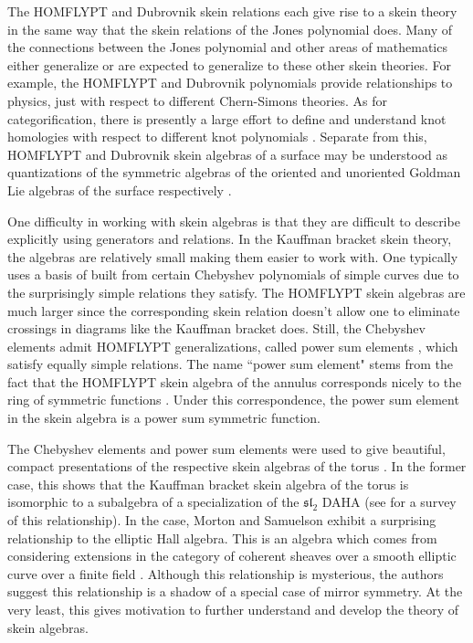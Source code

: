 The HOMFLYPT and Dubrovnik skein relations each give rise to a skein theory in the same way that the skein relations of the Jones polynomial does. Many of the connections between the Jones polynomial and other areas of mathematics either generalize or are expected to generalize to these other skein theories. For example, the HOMFLYPT and Dubrovnik polynomials provide relationships to physics, just with respect to different Chern-Simons theories. As for categorification, there is presently a large effort to define and understand knot homologies with respect to different knot polynomials \cite{KR08, Web17}. Separate from this, HOMFLYPT and Dubrovnik skein algebras of a surface may be understood as quantizations of the symmetric algebras of the oriented and unoriented Goldman Lie algebras of the surface respectively \cite{Tur91}. 

One difficulty in working with skein algebras is that they are difficult to describe explicitly using generators and relations. In the Kauffman bracket skein theory, the algebras are relatively small making them easier to work with. One typically uses a basis of built from certain Chebyshev polynomials of simple curves due to the surprisingly simple relations they satisfy. The HOMFLYPT skein algebras are much larger since the corresponding skein relation doesn't allow one to eliminate crossings in diagrams like the Kauffman bracket does. Still, the Chebyshev elements admit HOMFLYPT generalizations, called power sum elements \cite{Mor02b}, which satisfy equally simple relations. The name ``power sum element" stems from the fact that the HOMFLYPT skein algebra of the annulus corresponds nicely to the ring of symmetric functions \cite{Luk05}. Under this correspondence, the power sum element in the skein algebra is a power sum symmetric function. 

The Chebyshev elements and power sum elements were used to give beautiful, compact presentations of the respective skein algebras of the torus \cite{FG00, MS17}. In the former case, this shows that the Kauffman bracket skein algebra of the torus is isomorphic to a subalgebra of a specialization of the $\mathfrak{sl}_2$ DAHA (see \cite{MS19} for a survey of this relationship). In the case, Morton and Samuelson exhibit a surprising relationship to the elliptic Hall algebra. This is an algebra which comes from considering extensions in the category of coherent sheaves over a smooth elliptic curve over a finite field \cite{BS12}. Although this relationship is mysterious, the authors suggest this relationship is a shadow of a special case of mirror symmetry. At the very least, this gives motivation to further understand and develop the theory of skein algebras.


